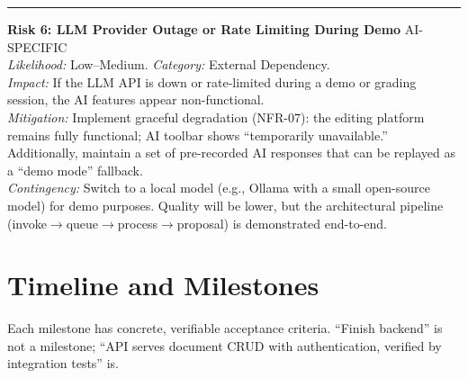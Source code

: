 \documentclass[10pt, a4paper]{article}
\newcommand{\lightrule}{{\color{border}\rule{\textwidth}{0.4pt}}}
\begin{document}
{\lightrule
\vspace{4pt}
\noindent\textbf{Risk 6: LLM Provider Outage or Rate Limiting During Demo} \hfill {\footnotesize\color{danger}\textsf{AI-SPECIFIC}}\\
\textit{Likelihood:} Low--Medium. \textit{Category:} External Dependency.\\
\textit{Impact:} If the LLM API is down or rate-limited during a demo or grading session, the AI features appear non-functional.\\
\textit{Mitigation:} Implement graceful degradation (NFR-07): the editing platform remains fully functional; AI toolbar shows ``temporarily unavailable.'' Additionally, maintain a set of pre-recorded AI responses that can be replayed as a ``demo mode'' fallback.\\
\textit{Contingency:} Switch to a local model (e.g., Ollama with a small open-source model) for demo purposes. Quality will be lower, but the architectural pipeline (invoke$\to$queue$\to$process$\to$proposal) is demonstrated end-to-end.
}


\section{Timeline and Milestones}

\begin{decisionbox}
\small Each milestone has concrete, verifiable acceptance criteria. ``Finish backend'' is not a milestone; ``API serves document CRUD with authentication, verified by integration tests'' is.
\end{decisionbox}
\end{document}
